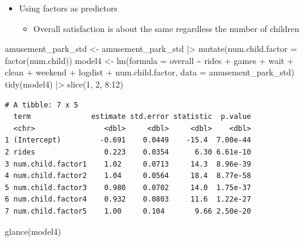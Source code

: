 \documentclass[
  ignorenonframetext,
]{beamer}
\newenvironment{Shaded}{\begin{snugshade}}{\end{snugshade}}
\newcommand{\AttributeTok}[1]{\textcolor[rgb]{0.40,0.45,0.13}{#1}}
\newcommand{\DecValTok}[1]{\textcolor[rgb]{0.68,0.00,0.00}{#1}}
\newcommand{\FunctionTok}[1]{\textcolor[rgb]{0.28,0.35,0.67}{#1}}
\newcommand{\NormalTok}[1]{\textcolor[rgb]{0.00,0.23,0.31}{#1}}
\newcommand{\OtherTok}[1]{\textcolor[rgb]{0.00,0.23,0.31}{#1}}
\newcommand{\SpecialCharTok}[1]{\textcolor[rgb]{0.37,0.37,0.37}{#1}}
\providecommand{\tightlist}{%
  \setlength{\itemsep}{0pt}\setlength{\parskip}{0pt}}\usepackage{longtable,booktabs,array}
\begin{document}
\begin{frame}[fragile]{}
\label{section-37}
\begin{itemize}
\item
  Using factors as predictors

  \begin{itemize}
  \tightlist
  \item
    Overall satisfaction is about the same regardless the number of
    children
  \end{itemize}
\end{itemize}

\tiny

\begin{Shaded}
\begin{Highlighting}[]
\NormalTok{amusement\_park\_std }\OtherTok{\textless{}{-}}\NormalTok{ amusement\_park\_std }\SpecialCharTok{|\textgreater{}} 
  \FunctionTok{mutate}\NormalTok{(}\AttributeTok{num.child.factor =} \FunctionTok{factor}\NormalTok{(num.child))}
\NormalTok{model4 }\OtherTok{\textless{}{-}} \FunctionTok{lm}\NormalTok{(}\AttributeTok{formula =}\NormalTok{ overall }\SpecialCharTok{\textasciitilde{}}\NormalTok{ rides }\SpecialCharTok{+}\NormalTok{ games }\SpecialCharTok{+}\NormalTok{ wait }\SpecialCharTok{+}\NormalTok{ clean }\SpecialCharTok{+}\NormalTok{ weekend }\SpecialCharTok{+}\NormalTok{ logdist }\SpecialCharTok{+}\NormalTok{ num.child.factor,}
             \AttributeTok{data =}\NormalTok{ amusement\_park\_std)}
\FunctionTok{tidy}\NormalTok{(model4) }\SpecialCharTok{|\textgreater{}} \FunctionTok{slice}\NormalTok{(}\DecValTok{1}\NormalTok{, }\DecValTok{2}\NormalTok{, }\DecValTok{8}\SpecialCharTok{:}\DecValTok{12}\NormalTok{)}
\end{Highlighting}
\end{Shaded}

\begin{verbatim}
# A tibble: 7 x 5
  term              estimate std.error statistic  p.value
  <chr>                <dbl>     <dbl>     <dbl>    <dbl>
1 (Intercept)         -0.691    0.0449    -15.4  7.00e-44
2 rides                0.223    0.0354      6.30 6.61e-10
3 num.child.factor1    1.02     0.0713     14.3  8.96e-39
4 num.child.factor2    1.04     0.0564     18.4  8.77e-58
5 num.child.factor3    0.980    0.0702     14.0  1.75e-37
6 num.child.factor4    0.932    0.0803     11.6  1.22e-27
7 num.child.factor5    1.00     0.104       9.66 2.50e-20
\end{verbatim}

\begin{Shaded}
\begin{Highlighting}[]
\FunctionTok{glance}\NormalTok{(model4)}
\end{Highlighting}
\end{Shaded}


\end{frame}
\end{document}
